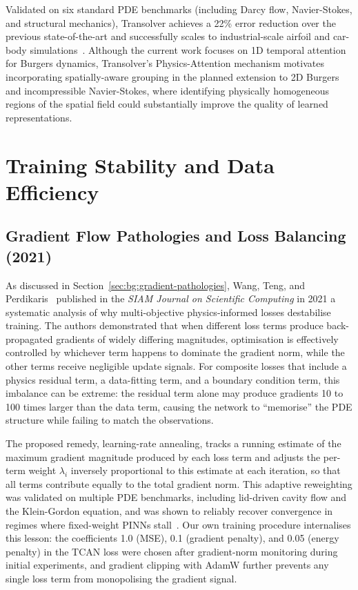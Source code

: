 Validated on six standard PDE benchmarks (including Darcy flow, Navier-Stokes, and structural mechanics), Transolver achieves a 22\% error reduction over the previous state-of-the-art and successfully scales to industrial-scale airfoil and car-body simulations~\cite{wu2024transolver}. Although the current work focuses on 1D temporal attention for Burgers dynamics, Transolver's Physics-Attention mechanism motivates incorporating spatially-aware grouping in the planned extension to 2D Burgers and incompressible Navier-Stokes, where identifying physically homogeneous regions of the spatial field could substantially improve the quality of learned representations.

\section{Training Stability and Data Efficiency}
\label{sec:bg:training}

\subsection{Gradient Flow Pathologies and Loss Balancing (2021)}
\label{sec:bg:loss-balancing}

As discussed in Section~\ref{sec:bg:gradient-pathologies}, Wang, Teng, and Perdikaris~\cite{wang2021understanding} published in the \emph{SIAM Journal on Scientific Computing} in 2021 a systematic analysis of why multi-objective physics-informed losses destabilise training. The authors demonstrated that when different loss terms produce back-propagated gradients of widely differing magnitudes, optimisation is effectively controlled by whichever term happens to dominate the gradient norm, while the other terms receive negligible update signals. For composite losses that include a physics residual term, a data-fitting term, and a boundary condition term, this imbalance can be extreme: the residual term alone may produce gradients 10 to 100 times larger than the data term, causing the network to ``memorise'' the PDE structure while failing to match the observations.

The proposed remedy, learning-rate annealing, tracks a running estimate of the maximum gradient magnitude produced by each loss term and adjusts the per-term weight $\lambda_i$ inversely proportional to this estimate at each iteration, so that all terms contribute equally to the total gradient norm. This adaptive reweighting was validated on multiple PDE benchmarks, including lid-driven cavity flow and the Klein-Gordon equation, and was shown to reliably recover convergence in regimes where fixed-weight PINNs stall~\cite{wang2021understanding}. Our own training procedure internalises this lesson: the coefficients 1.0 (MSE), 0.1 (gradient penalty), and 0.05 (energy penalty) in the TCAN loss were chosen after gradient-norm monitoring during initial experiments, and gradient clipping with AdamW further prevents any single loss term from monopolising the gradient signal.


